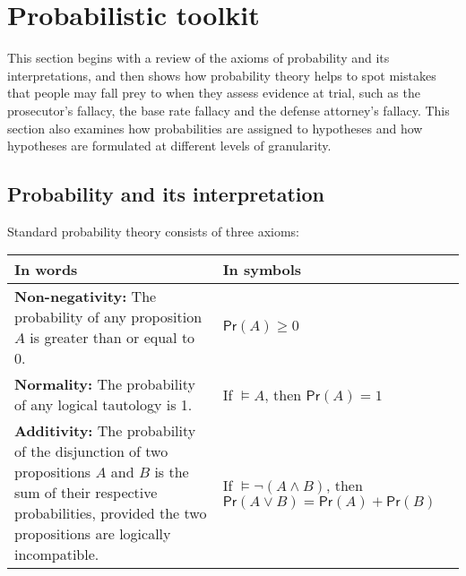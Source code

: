 \documentclass{article}
\newcommand{\pr}{\mathsf{Pr}}
\begin{document}
\section{Probabilistic toolkit}



\label{sec:toolkit}


This section begins with a  review of the axioms of probability and its interpretations, %
and then shows how probability theory helps to spot mistakes that people may fall prey to when they assess evidence at trial, such as the prosecutor's fallacy, the base rate fallacy and the defense attorney's fallacy. %
This section also examines how probabilities are assigned to hypotheses  %
and how hypotheses are formulated at different levels of granularity. %





\subsection{Probability and its interpretation}
\label{subsec:prob-int}


%
Standard probability theory  consists of  three axioms: %
\begin{center}
\begin{tabular}{@{}p{7cm}p{4.5cm}@{}}\toprule
 In words & In symbols \\ \midrule
\textbf{Non-negativity:}   The probability of any proposition $A$
is greater than or equal to  0. & $\pr(A)\geq 0$\\
 \textbf{Normality:}  The probability of any 
logical tautology is 1.  & If $\models A$, then $\pr(A)=1$\\
\textbf{Additivity:}   The probability of the disjunction 
of two propositions $A$ and $B$  is the sum of their 
respective probabilities, provided the two propositions are logically incompatible. 
& 
If $\models  \neg (A \wedge B)$, then \newline
$\pr(A\vee B)=\pr(A)+\pr(B)$\\ \bottomrule 
\end{tabular}
\end{center}
%
\end{document}

